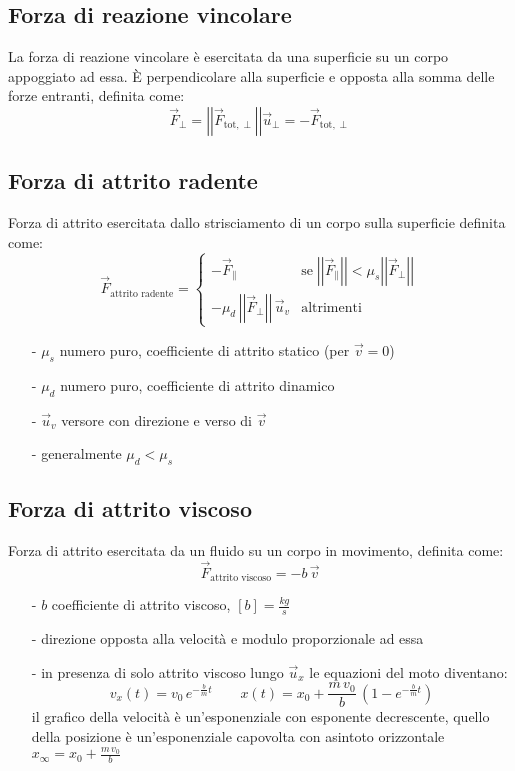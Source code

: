 \documentclass[a4paper]{article}
\newcommand\ux{\vec{u}_x}
\newcommand\uv{\vec{u}_v}
\newcommand\uper{\vec{u}_\perp}
\newcommand\vmod[1]{\left|\left|{#1}\right|\right|}
\begin{document}
\subsection{Forza di reazione vincolare}
La forza di reazione vincolare è esercitata da una superficie su un corpo appoggiato ad essa. È perpendicolare alla superficie e
opposta alla somma delle forze entranti, definita come:
\[\vec{F}_\perp = \vmod{\vec{F}_{\text{tot},\perp}} \uper = -\vec{F}_{\text{tot},\perp}\]

\subsection{Forza di attrito radente}
Forza di attrito esercitata dallo strisciamento di un corpo sulla superficie definita come:
\[\vec{F}_\text{attrito radente} = \begin{cases}
	-\vec{F}_{\parallel} &\text{se} \; \vmod{\vec{F}_\parallel} < \mu_s \vmod{\vec{F}_\perp}\\
	-\mu_d \, \vmod{\vec{F}_\perp} \, \uv &\text{altrimenti}
\end{cases}\]

\begin{itemize}[topsep=3pt, itemsep=0pt]
	\item[-] \(\mu_s\) numero puro, coefficiente di attrito statico (per \(\vec{v}=0\))
	\item[-] \(\mu_d\) numero puro, coefficiente di attrito dinamico
	\item[-] \(\uv\) versore con direzione e verso di \(\vec{v}\)
	\item[-] generalmente \(\mu_d < \mu_s\)
\end{itemize}

\subsection{Forza di attrito viscoso}
Forza di attrito esercitata da un fluido su un corpo in movimento, definita come:
\[\vec{F}_\text{attrito viscoso} = - b \, \vec{v}\]
\begin{itemize}[topsep=3pt, itemsep=0pt]
	\item[-] \(b\) coefficiente di attrito viscoso, \(\left[b\right] = \frac{kg}{s}\)
	\item[-] direzione opposta alla velocità e modulo proporzionale ad essa
	\item[-] in presenza di solo attrito viscoso lungo \(\ux\) le equazioni del moto diventano:
	\[v_x(t) = v_0 \, e^{-\frac{b}{m}t} \qquad x(t) = x_0 + \frac{m \, v_0}{b} \, \left(1-e^{-\frac{b}{m}t}\right)\]
	il grafico della velocità è un'esponenziale con esponente decrescente, quello della posizione è un'esponenziale capovolta con asintoto orizzontale \(x_{\infty} = x_0 + \frac{m \, v_0}{b}\)
\end{itemize}
\end{document}
